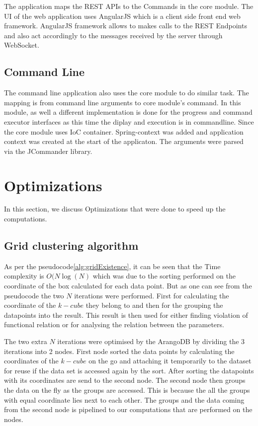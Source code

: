 The application maps the REST APIs to the Commands in the core module. The UI of the web application uses AngularJS which is a client side front end web framework. AngularJS framework allows to makes calls to the REST Endpoints and also act accordingly to the messages received by the server through WebSocket.

\subsection{Command Line}

The command line application also uses the core module to do similar task. The mapping is from command line arguments to core module's command. In this module, as well a different implementation is done for the progress and command executor interfaces as this time the diplay and execution is in commandline. Since the core module uses IoC container. Spring-context was added and application context was created at the start of the applicaton. The arguments were parsed via the JCommander library. 

\section{Optimizations}

In this section, we discuss Optimizations that were done to speed up the computations.

\subsection{Grid clustering algorithm}

As per the pseudocode\ref{alg:gridExistence}, it can be seen that the Time complexity is \(O(N\log(N)\) which was due to the sorting performed on the coordinate of the box calculated for each data point. But as one can see from the pseudocode the two \(N\) iterations were performed. First for calculating the coordinate of the \(k-cube\) they belong to and then for the grouping the datapoints into the result. This result is then used for either finding violation of functional relation or for analysing the relation between the parameters. 

The two extra \(N\) iterations were optimised by the ArangoDB by dividing the 3 iterations into 2 nodes. First node sorted the data points by calculating the coordinates of the \(k-cube\) on the go and attaching it temporarily to the dataset for reuse if the data set is accessed again by the sort. After sorting the datapoints with its coordinates are send to the second node. The second node then groups the data on the fly as the groups are accessed. This is because the all the groups with equal coordinate lies next to each other. The groups and the data coming from the second node is pipelined to our computations that are performed on the nodes. 

